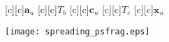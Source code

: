 \documentclass{article}
\begin{document}
\begin{figure}[htb]
  \begin{center}


        [c][c]{$\mathrm{\mathbf{a}}_u$}
        [c][c]{$T_b$}
        [c][c]{$\mathrm{\mathbf{c}}_u$}
        [c][c]{$T_c$}
        [c][c]{$\mathrm{\mathbf{x}}_u$}
		

    \texttt{[image: spreading\_psfrag.eps]}
    \end{center}
\end{figure}
\end{document}
